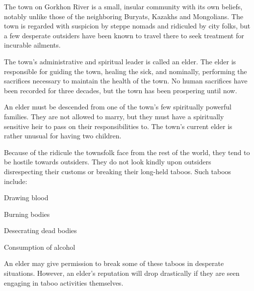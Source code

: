 \documentclass[blue]{Pestilence}
\begin{document}
\name{\bTownElders{}}

The town on Gorkhon River is a small, insular community with its own beliefs, notably unlike those of the neighboring Buryats, Kazakhs and Mongolians. The town is regarded with suspicion by steppe nomads and ridiculed by city folks, but a few desperate outsiders have been known to travel there to seek treatment for incurable ailments.

The town's administrative and spiritual leader is called an elder. The elder is responsible for guiding the town, healing the sick, and nominally, performing the sacrifices necessary to maintain the health of the town. No human sacrifices have been recorded for three decades, but the town has been prospering until now.

An elder must be descended from one of the town's few spiritually powerful families. They are not allowed to marry, but they must have a spiritually sensitive heir to pass on their responsibilities to. The town's current elder is rather unusual for having two children. 

Because of the ridicule the townsfolk face from the rest of the world, they tend to be hostile towards outsiders. They do not look kindly upon outsiders disrespecting their customs or breaking their long-held taboos. Such taboos include:

\begin{itemz}
	\item Drawing blood
	\item Burning bodies
	\item Desecrating dead bodies
	\item Consumption of alcohol
\end{itemz}

An elder may give permission to break some of these taboos in desperate situations. However, an elder's reputation will drop drastically if they are seen engaging in taboo activities themselves.
\end{document}
